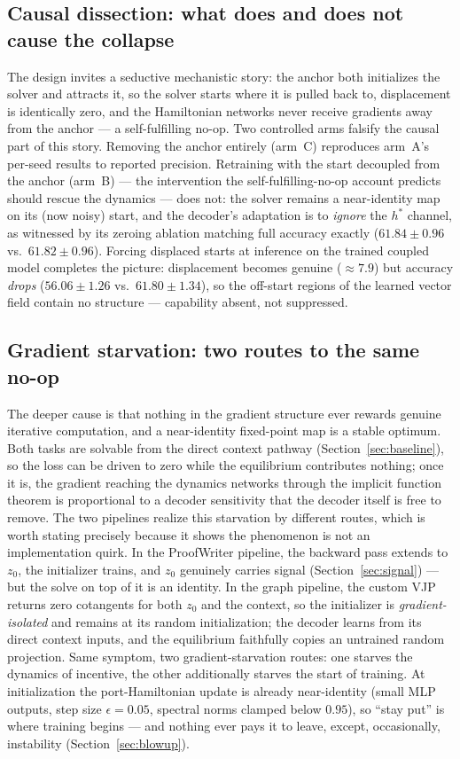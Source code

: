 \documentclass[11pt]{article}
\newcommand{\hstar}{h^{*}}
\newcommand{\zzero}{z_{0}}
\begin{document}
\subsection{Causal dissection: what does and does not cause the collapse}
\label{sec:causal}
The design invites a seductive mechanistic story: the anchor both
initializes the solver and attracts it, so the solver starts where it
is pulled back to, displacement is identically zero, and the
Hamiltonian networks never receive gradients away from the anchor --- a
self-fulfilling no-op. Two controlled arms falsify the causal part of
this story. Removing the anchor entirely (arm~C) reproduces arm~A's
per-seed results to reported precision. Retraining with the start
decoupled from the anchor (arm~B) --- the intervention the
self-fulfilling-no-op account predicts should rescue the dynamics ---
does not: the solver remains a near-identity map on its (now noisy)
start, and the decoder's adaptation is to \emph{ignore} the $\hstar$
channel, as witnessed by its zeroing ablation matching full accuracy
exactly ($61.84\pm0.96$ vs.\ $61.82\pm0.96$). Forcing displaced starts
at inference on the trained coupled model completes the picture:
displacement becomes genuine ($\approx7.9$) but accuracy \emph{drops}
($56.06\pm1.26$ vs.\ $61.80\pm1.34$), so the off-start regions of the
learned vector field contain no structure --- capability absent, not
suppressed.

\subsection{Gradient starvation: two routes to the same no-op}
\label{sec:starvation}
The deeper cause is that nothing in the gradient structure ever
rewards genuine iterative computation, and a near-identity fixed-point
map is a stable optimum. Both tasks are solvable from the direct
context pathway (Section~\ref{sec:baseline}), so the loss can be
driven to zero while the equilibrium contributes nothing; once it is,
the gradient reaching the dynamics networks through the implicit
function theorem is proportional to a decoder sensitivity that the
decoder itself is free to remove. The two pipelines realize this
starvation by different routes, which is worth stating precisely
because it shows the phenomenon is not an implementation quirk.
In the ProofWriter pipeline, the backward pass extends to $\zzero$, the
initializer trains, and $\zzero$ genuinely carries signal
(Section~\ref{sec:signal}) --- but the solve on top of it is an
identity. In the graph pipeline, the custom VJP returns zero
cotangents for both $\zzero$ and the context, so the initializer is
\emph{gradient-isolated} and remains at its random initialization;
the decoder learns from its direct context inputs, and the equilibrium
faithfully copies an untrained random projection. Same symptom, two
gradient-starvation routes: one starves the dynamics of incentive, the
other additionally starves the start of training. At initialization
the port-Hamiltonian update is already near-identity (small MLP
outputs, step size $\epsilon=0.05$, spectral norms clamped below
$0.95$), so ``stay put'' is where training begins --- and nothing ever
pays it to leave, except, occasionally, instability
(Section~\ref{sec:blowup}).
\end{document}
